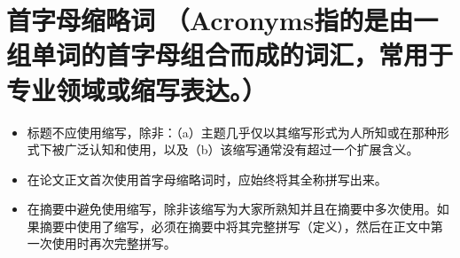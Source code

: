 \section*{首字母缩略词
（Acronyms指的是由一组单词的首字母组合而成的词汇，常用于专业领域或缩写表达。）}
\begin{itemize}
\item 标题不应使用缩写，除非：（a）主题几乎仅以其缩写形式为人所知或在那种形式下被广泛认知和使用，以及（b）该缩写通常没有超过一个扩展含义。
\item 在论文正文首次使用首字母缩略词时，应始终将其全称拼写出来。
\item 在摘要中避免使用缩写，除非该缩写为大家所熟知并且在摘要中多次使用。如果摘要中使用了缩写，必须在摘要中将其完整拼写（定义），然后在正文中第一次使用时再次完整拼写。
\end{itemize}

